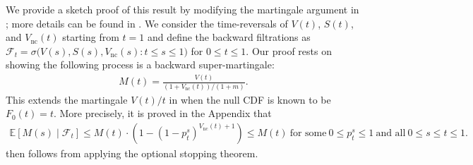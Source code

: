 \documentclass[a4paper,11pt]{article}
\theoremstyle{plain}
\theoremstyle{definition}
\def\EE{\mathbb{E}}
\def\calF{\mathcal{F}}
\theoremstyle{plain}
\newcommand{\NoNc}{m}
\newcommand{\cdfTestStatistics}[1]{{F_{#1}}}
\newcommand{\cdfTestStatisticsNull}{{F_{0}}}
\newcommand{\ncCdfTestStatistics}[1]{{F^{\text{nc}}_{#1}}}
\newcommand{\truePositive}{{S}}
\newcommand{\falsePositive}{{V}}
\newcommand{\ncFalsePositive}{{V_{\text{nc}}}}
\begin{document}
We provide a sketch proof of this result by modifying the martingale
argument in \cite{storey2004strong}; more details can be found in
.
We consider the time-reversals of $\falsePositive(t)$,
$\truePositive(t)$, and $\ncFalsePositive(t)$ starting from $t=1$
and define the backward filtrations as $\calF_t =
\sigma\big(\falsePositive(s), \truePositive(s), \ncFalsePositive(s): t
\le s \le 1\big)$ for $0 \leq t \leq 1$.
Our proof rests on showing the following process is a backward
super-martingale:
\begin{align}\label{eq:super.martingale}
    M(t) = \frac{\falsePositive(t)}{(1+\ncFalsePositive(t))/(1+\NoNc)}.
\end{align}
This extends the martingale $V(t)/t$ in \cite{storey2004strong} when
the null CDF is known to be $F_0(t) = t$.
More precisely, it is proved in the Appendix that
\begin{align} \label{eq:super-martingale}
    \EE\left[M(s) \mid \calF_t \right] \leq M(t)
    \cdot \left(1 - \left(1-p_t^s%
  \right)^{\ncFalsePositive(t) + 1} \right)
    \le M(t)~\text{for some}~0 \leq p_{t}^s \leq 1 ~\text{and all}~0
  \leq s \leq t \leq 1.
\end{align}
 then follows from applying the optional
stopping theorem.
\end{document}
